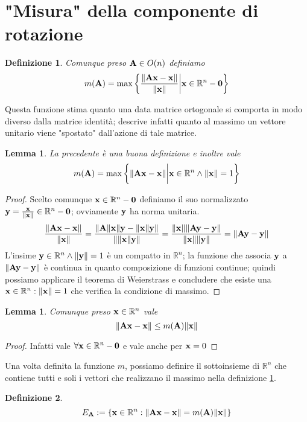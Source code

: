 \documentclass[a4paper,11pt,openright,twoside	]{book}
\newtheorem{definition}{Definizione}[section]
\newtheorem{lemma}[theorem]{Lemma}
\begin{document}
\section{"Misura" della componente di rotazione}
\begin{definition}
\label{def:misura}
Comunque preso  $  \vb{A} \in O(n) $ definiamo
\[ m(\vb{A}) = \max \bigg\{ \frac{\norm{\vb{Ax-x}}}{\norm{\vb{x}}} \bigg|  \vb{x} \in \mathbb{R}^{n}-\vb{0} \bigg\} \]
\end{definition}
Questa funzione stima quanto una data matrice ortogonale si comporta in modo diverso dalla matrice identità; descrive infatti quanto al massimo un vettore unitario viene "spostato" dall'azione di tale matrice. 
\begin{lemma}
La precedente è una buona definizione e inoltre vale
\[ m(\vb{A}) = \max \bigg\{ \norm{\vb{Ax-x}} \bigg|  \vb{x} \in \mathbb{R}^{n} \land \norm{\vb{x}} = 1 \bigg\} \]
\end{lemma}
\begin{proof}
Scelto comunque $\vb{x} \in \mathbb{R}^{n}-\vb{0}$ definiamo il suo normalizzato  $ \vb{y}  =  \frac{\vb{x}}{\norm{\vb{x}}} \in \mathbb{R}^{n}-\vb{0}$; ovviamente $ \vb{y} $ ha norma unitaria.
\[ \frac{\norm{\vb{Ax-x}}}{\norm{\vb{x}}} = \frac{\norm{\vb{A}\norm{\vb{x}} \vb{y}-\norm{\vb{x}} \vb{y}}}{\norm{\norm{\vb{x}} \vb{y}}} =   \frac{\norm{\vb{x}} \norm{\vb{Ay-y}}}{\norm{\vb{x}} \norm{\vb{y}}} = \norm{\vb{Ay-y}} \]
L'insime $\vb{y} \in \mathbb{R}^{n} \land \norm{\vb{y}} = 1 $  è un compatto in  $\mathbb{R}^{n}$; la funzione che associa $\vb{y}$ a  $\norm{\vb{Ay-y}}$ è continua in quanto composizione di funzioni continue; quindi possiamo applicare il teorema di Weierstrass e concludere che esiste una $\vb{x} \in \mathbb{R}^{n} : \norm{\vb{x}} = 1$ che verifica la condizione di massimo. 
\end{proof}
\begin{lemma}
Comunque preso $ \vb{x} \in \mathbb{R}^{n}$  vale  \[ \norm{\vb{Ax-x}} \leq m(\vb{A}) \norm{\vb{x}} \]
\end{lemma}
\begin{proof}
Infatti vale $\forall \vb{x} \in \mathbb{R}^{n}-\vb{0}$  e vale anche per  $\vb{x}=0$
\end{proof}
Una volta definita la funzione $m$, possiamo definire il sottoinsieme di $\mathbb{R}^n$ che contiene tutti e soli i vettori che realizzano il massimo nella definizione \ref{def:misura}. 
\begin{definition}
\[ E_{\vb{A}} := \{ \vb{x} \in \mathbb{R}^{n} :  \norm{\vb{Ax - x}} = m(\vb{A}) \norm{\vb{x}}\} \]
\end{definition}
\end{document}
